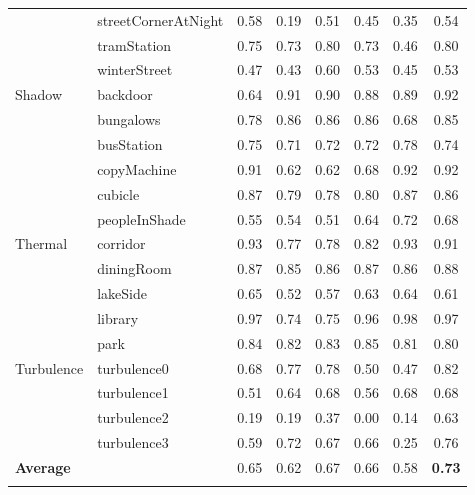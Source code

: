 \begin{table*}[t]
\begin{tabular}{llcccccc}
 & streetCornerAtNight & 0.58 & 0.19 & 0.51 & 0.45 & 0.35 & 0.54 \\
 & tramStation & 0.75 & 0.73 & 0.80 & 0.73 & 0.46 & 0.80 \\
 & winterStreet & 0.47 & 0.43 & 0.60 & 0.53 & 0.45 & 0.53 \\
\midrule
\multirow{6}{*}{Shadow} & backdoor & 0.64 & 0.91 & 0.90 & 0.88 & 0.89 & 0.92 \\
 & bungalows & 0.78 & 0.86 & 0.86 & 0.86 & 0.68 & 0.85 \\
 & busStation & 0.75 & 0.71 & 0.72 & 0.72 & 0.78 & 0.74 \\
 & copyMachine & 0.91 & 0.62 & 0.62 & 0.68 & 0.92 & 0.92 \\
 & cubicle & 0.87 & 0.79 & 0.78 & 0.80 & 0.87 & 0.86 \\
 & peopleInShade & 0.55 & 0.54 & 0.51 & 0.64 & 0.72 & 0.68 \\
\midrule
\multirow{5}{*}{Thermal} & corridor & 0.93 & 0.77 & 0.78 & 0.82 & 0.93 & 0.91 \\
 & diningRoom & 0.87 & 0.85 & 0.86 & 0.87 & 0.86 & 0.88 \\
 & lakeSide & 0.65 & 0.52 & 0.57 & 0.63 & 0.64 & 0.61 \\
 & library & 0.97 & 0.74 & 0.75 & 0.96 & 0.98 & 0.97 \\
 & park & 0.84 & 0.82 & 0.83 & 0.85 & 0.81 & 0.80 \\
\midrule
\multirow{4}{*}{Turbulence} & turbulence0 & 0.68 & 0.77 & 0.78 & 0.50 & 0.47 & 0.82 \\
 & turbulence1 & 0.51 & 0.64 & 0.68 & 0.56 & 0.68 & 0.68 \\
 & turbulence2 & 0.19 & 0.19 & 0.37 & 0.00 & 0.14 & 0.63 \\
 & turbulence3 & 0.59 & 0.72 & 0.67 & 0.66 & 0.25 & 0.76 \\
\midrule
\textbf{Average} & & 0.65 & 0.62 & 0.67 & 0.66 & 0.58 & \textbf{0.73} \\
\bottomrule
\label{tab:all_f1}
\end{tabular}
\end{table*}